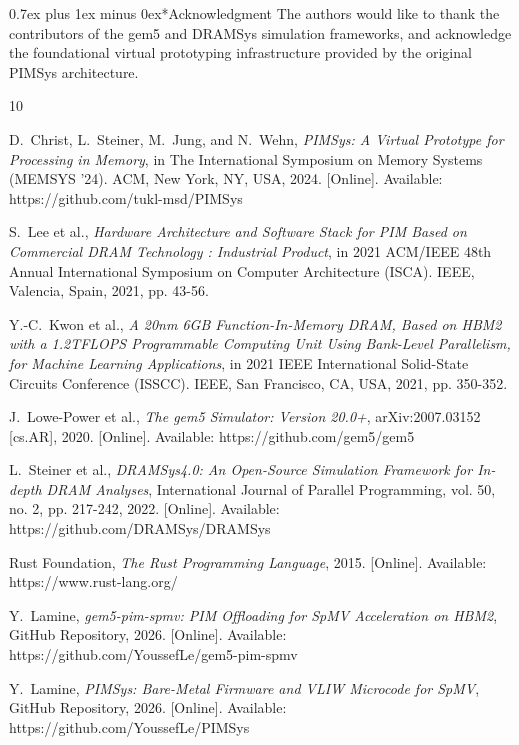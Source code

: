 \documentclass[conference]{IEEEtran}
\makeatletter
\renewcommand{\section}{\@startsection{section}{1}{\z@}{3.0ex plus 1.5ex minus 1.5ex}%
{0.7ex plus 1ex minus 0ex}{\normalfont\normalsize\centering\bfseries\scshape}}
\makeatother
\begin{document}
\section*{Acknowledgment}
The authors would like to thank the contributors of the gem5 and DRAMSys simulation frameworks, and acknowledge the foundational virtual prototyping infrastructure provided by the original PIMSys architecture.

\begin{thebibliography}{10}

D.~Christ, L.~Steiner, M.~Jung, and N.~Wehn, \emph{PIMSys: A Virtual Prototype for Processing in Memory}, in The International Symposium on Memory Systems (MEMSYS '24). ACM, New York, NY, USA, 2024. [Online]. Available: https://github.com/tukl-msd/PIMSys

S.~Lee et al., \emph{Hardware Architecture and Software Stack for PIM Based on Commercial DRAM Technology : Industrial Product}, in 2021 ACM/IEEE 48th Annual International Symposium on Computer Architecture (ISCA). IEEE, Valencia, Spain, 2021, pp. 43-56.

Y.-C.~Kwon et al., \emph{A 20nm 6GB Function-In-Memory DRAM, Based on HBM2 with a 1.2TFLOPS Programmable Computing Unit Using Bank-Level Parallelism, for Machine Learning Applications}, in 2021 IEEE International Solid-State Circuits Conference (ISSCC). IEEE, San Francisco, CA, USA, 2021, pp. 350-352.

J.~Lowe-Power et al., \emph{The gem5 Simulator: Version 20.0+}, arXiv:2007.03152 [cs.AR], 2020. [Online]. Available: https://github.com/gem5/gem5

L.~Steiner et al., \emph{DRAMSys4.0: An Open-Source Simulation Framework for In-depth DRAM Analyses}, International Journal of Parallel Programming, vol. 50, no. 2, pp. 217-242, 2022. [Online]. Available: https://github.com/DRAMSys/DRAMSys

Rust Foundation, \emph{The Rust Programming Language}, 2015. [Online]. Available: https://www.rust-lang.org/

Y.~Lamine, \emph{gem5-pim-spmv: PIM Offloading for SpMV Acceleration on HBM2}, GitHub Repository, 2026. [Online]. Available: https://github.com/YoussefLe/gem5-pim-spmv

Y.~Lamine, \emph{PIMSys: Bare-Metal Firmware and VLIW Microcode for SpMV}, GitHub Repository, 2026. [Online]. Available: https://github.com/YoussefLe/PIMSys

\end{thebibliography}

\end{document}
